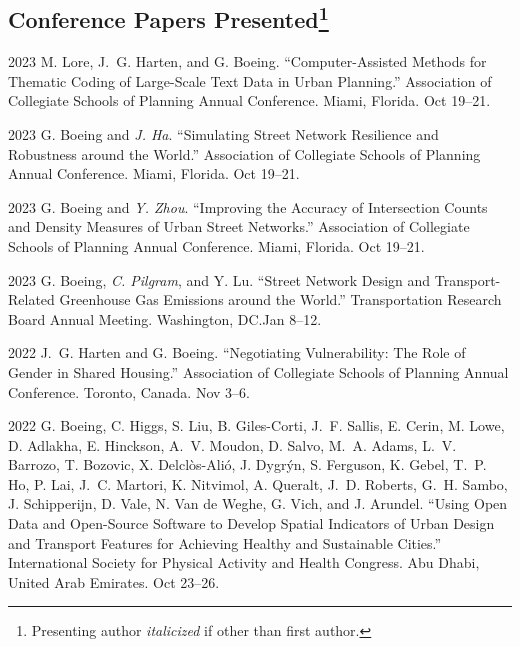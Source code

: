 \documentclass[11pt,letterpaper]{report}
\begin{document}
    \subsection*{Conference Papers Presented\footnote{Presenting author \textit{italicized} if other than first author.}}

    \begin{tablist}

        \item[2023] \tab{}M. Lore, J.~G. Harten, and G. Boeing. \enquote{Computer-Assisted Methods for Thematic Coding of Large-Scale Text Data in Urban Planning.} Association of Collegiate Schools of Planning Annual Conference. Miami, Florida. Oct 19--21.

        \item[2023] \tab{}G. Boeing and \textit{J. Ha}. \enquote{Simulating Street Network Resilience and Robustness around the World.} Association of Collegiate Schools of Planning Annual Conference. Miami, Florida. Oct 19--21.

        \item[2023] \tab{}G. Boeing and \textit{Y. Zhou}. \enquote{Improving the Accuracy of Intersection Counts and Density Measures of Urban Street Networks.} Association of Collegiate Schools of Planning Annual Conference. Miami, Florida. Oct 19--21.

        \item[2023] \tab{}G. Boeing, \textit{C. Pilgram}, and Y. Lu. \enquote{Street Network Design and Transport-Related Greenhouse Gas Emissions around the World.} Transportation Research Board Annual Meeting. Washington, DC.\@ Jan 8--12.

        \item[2022] \tab{}J.~G. Harten and G. Boeing. \enquote{Negotiating Vulnerability: The Role of Gender in Shared Housing.} Association of Collegiate Schools of Planning Annual Conference. Toronto, Canada. Nov 3--6.

        \item[2022] \tab{}G. Boeing, C. Higgs, S. Liu, B. Giles-Corti, J.~F. Sallis, E. Cerin, M. Lowe, D. Adlakha, E. Hinckson, A.~V. Moudon, D. Salvo, M.~A. Adams, L.~V. Barrozo, T. Bozovic, X. Delclòs-Alió, J. Dygrýn, S. Ferguson, K. Gebel, T.~P. Ho, P. Lai, J.~C. Martori, K. Nitvimol, A. Queralt, J.~D. Roberts, G.~H. Sambo, J. Schipperijn, D. Vale, N. Van de Weghe, G. Vich, and J. Arundel. \enquote{Using Open Data and Open-Source Software to Develop Spatial Indicators of Urban Design and Transport Features for Achieving Healthy and Sustainable Cities.} International Society for Physical Activity and Health Congress. Abu Dhabi, United Arab Emirates. Oct 23--26.


\end{tablist}
\end{document}

